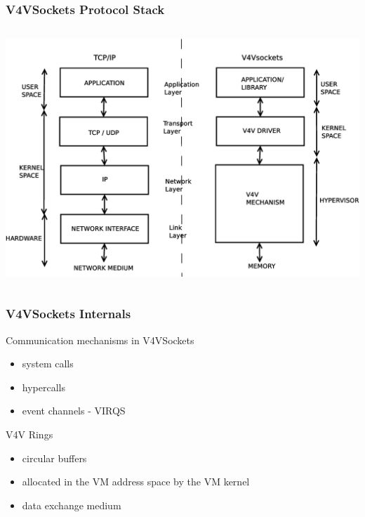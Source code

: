 \documentclass[red,slidestop,notes,compress,mathserif]{beamer}
\begin{document}
\begin{frame}
\frametitle{V4VSockets Protocol Stack}
\begin{columns}
\includegraphics[width=\textwidth]{figures/tcp_ip_vs_v4vsockets.eps}
\end{columns}
\end{frame}

\begin{frame}
\frametitle{V4VSockets Internals}
\begin{block}{Communication mechanisms in V4VSockets}
\begin{itemize}
\item system calls 
\item hypercalls
\item event channels - VIRQS
\end{itemize}
\end{block}
\begin{block}{V4V Rings}
\begin{itemize}
\item circular buffers 
\item allocated in the VM address space by the VM kernel
\item data exchange medium
\end{itemize}
\end{block}
\end{frame}
\end{document}
